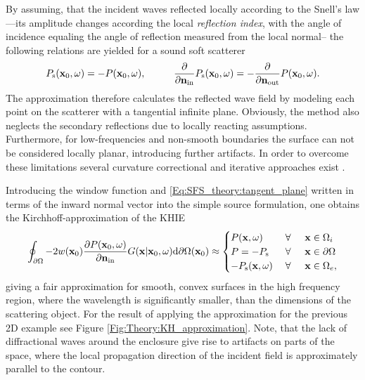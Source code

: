 \begin{itemize}
By assuming, that the incident waves reflected locally according to the Snell's law---its amplitude changes according the local \emph{reflection index}, with the angle of incidence equaling the angle of reflection measured from the local normal-- the following relations are yielded for a sound soft scatterer 
\begin{equation}
P_{\mathrm{s}}(\mathbf{x}_0,\omega) = -P(\mathbf{x}_0,\omega), \hspace{1cm} \frac{\partial}{\partial \mathbf{n}_{\mathrm{in}}} P_{\mathrm{s}}(\mathbf{x}_0,\omega) = -\frac{\partial}{\partial \mathbf{n}_{\mathrm{out}}} P(\mathbf{x}_0,\omega).
\label{Eq:SFS_theory:tangent_plane}
\end{equation}
The approximation therefore calculates the reflected wave field by modeling each point on the scatterer with a tangential infinite plane. Obviously, the method also neglects the secondary reflections due to locally reacting assumptions. Furthermore, for low-frequencies and non-smooth boundaries the surface can not be considered locally planar, introducing further artifacts. In order to overcome these limitations several curvature correctional and iterative approaches exist \cite{Elfouhaily2004}.
\end{itemize}

Introducing the window function and \eqref{Eq:SFS_theory:tangent_plane} written in terms of the inward normal vector into the simple source formulation, one obtains the Kirchhoff-approximation of the KHIE
\begin{equation}
\oint_{\partial \Omega} 
- 2w(\mathbf{x}_0)\frac{\partial P(\mathbf{x}_0,\omega)}{\partial \mathbf{n}_{\mathrm{in}}} 
G(\mathbf{x}|\mathbf{x}_0,\omega) 
\mathrm{d} \partial \Omega ( \mathbf{x}_0)
\approx
\begin{cases} 
P(\mathbf{x},\omega)     & \hspace{1mm} \forall \hspace{5mm}   \mathbf{x} \in \Omega_i \\
P=-P_{\mathrm{s}}  & \hspace{1mm} \forall \hspace{5mm}         \mathbf{x} \in \partial \Omega  \\
-P_{\mathrm{s}}(\mathbf{x},\omega)    & \hspace{1mm} \forall \hspace{5mm}  \mathbf{x} \in \Omega_e,
\end{cases}
\label{Eq:SFS_theory:Kirchhoff_appr}
\end{equation}
giving a fair approximation for smooth, convex surfaces in the high frequency region, where the wavelength is significantly smaller, than the dimensions of the scattering object. For the result of applying the approximation for the previous 2D example see Figure \ref{Fig:Theory:KH_approximation}. Note, that the lack of diffractional waves around the enclosure give rise to artifacts on parts of the space, where the local propagation direction of the incident field is approximately parallel to the contour.

